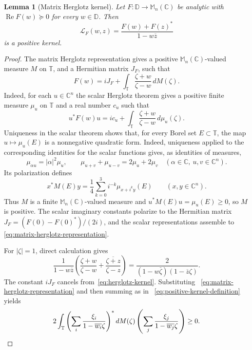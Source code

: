 \documentclass{aomart}
\newtheorem{lemma}[theorem]{Lemma}
\theoremstyle{definition}
\newcommand{\C}{\mathbb C}
\newcommand{\D}{\mathbb D}
\newcommand{\Torus}{\mathbb T}
\newcommand{\Mn}{\mathbb M_n(\C)}
\newcommand{\RePart}{\operatorname{Re}}
\begin{document}
\begin{lemma}[Matrix Herglotz kernel]
\label{lem:herglotz-kernel}
Let $F\colon\D\to\Mn$ be analytic with
$\RePart F(w)\succeq0$ for every $w\in\D$.  Then
\begin{equation}
  \mathcal L_F(w,z)
  =\frac{F(w)+F(z)^*}{1-w\overline z}
  \label{eq:herglotz-kernel}
\end{equation}
is a positive kernel.
\end{lemma}

\begin{proof}
The matrix Herglotz representation gives a positive
$\Mn$-valued measure $M$ on $\Torus$, and a Hermitian matrix $J_F$, such
that
\begin{equation}
  F(w)=iJ_F+\int_{\Torus}\frac{\zeta+w}{\zeta-w}\,dM(\zeta).
  \label{eq:matrix-herglotz-representation}
\end{equation}
Indeed, for each $u\in\C^n$ the scalar Herglotz theorem gives a positive
finite measure $\mu_u$ on $\Torus$ and a real number $c_u$ such that
\[
  u^*F(w)u=ic_u+
  \int_{\Torus}\frac{\zeta+w}{\zeta-w}\,d\mu_u(\zeta).
\]
Uniqueness in the scalar theorem shows that, for every Borel set
$E\subset\Torus$, the map $u\mapsto\mu_u(E)$ is a nonnegative quadratic
form.  Indeed, uniqueness applied to the corresponding identities for
the scalar functions gives, as identities of measures,
\[
  \mu_{\alpha u}=\lvert\alpha\rvert^2\mu_u,
  \qquad
  \mu_{u+v}+\mu_{u-v}=2\mu_u+2\mu_v
  \quad(\alpha\in\C,\ u,v\in\C^n).
\]
Its polarization defines
\[
  x^*M(E)y=\frac14\sum_{k=0}^3 i^{-k}
  \mu_{x+i^k y}(E)\qquad(x,y\in\C^n).
\]
Thus $M$ is a finite $\Mn$-valued measure and
$u^*M(E)u=\mu_u(E)\geq0$, so $M$ is positive.  The scalar imaginary
constants polarize to the Hermitian matrix
$J_F=(F(0)-F(0)^*)/(2i)$, and the scalar representations assemble to~%
\eqref{eq:matrix-herglotz-representation}.

For $\lvert\zeta\rvert=1$, direct calculation gives
\begin{equation}
  \frac{1}{1-w\overline z}\left(
   \frac{\zeta+w}{\zeta-w}
   +\overline{\frac{\zeta+z}{\zeta-z}}
  \right)
  =\frac{2}{(1-w\overline\zeta)(1-\overline z\zeta)}.
  \label{eq:scalar-herglotz-factorization}
\end{equation}
The constant $iJ_F$ cancels from~\eqref{eq:herglotz-kernel}.  Substituting~%
\eqref{eq:matrix-herglotz-representation} and then summing as in~%
\eqref{eq:positive-kernel-definition} yields
\[
  2\int_{\Torus}
  \left(\sum_i\frac{\xi_i}{1-\overline{w_i}\zeta}\right)^*
  dM(\zeta)
  \left(\sum_j\frac{\xi_j}{1-\overline{w_j}\zeta}\right)
  \geq0.\qedhere
\]
\end{proof}
\end{document}
